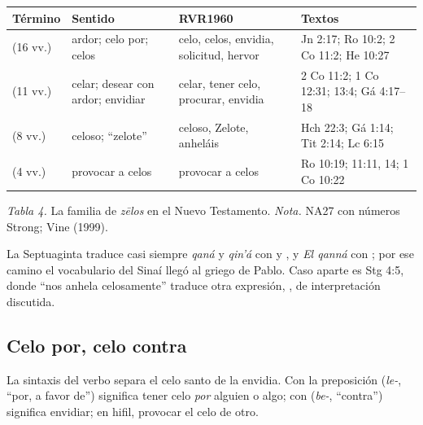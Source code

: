 \begin{center}\small\renewcommand{\arraystretch}{1.15}
\begin{tabular}{@{}L{2.8cm}L{3.6cm}L{3.6cm}L{3.8cm}@{}}
\toprule
\textbf{Término} & \textbf{Sentido} & \textbf{RVR1960} & \textbf{Textos} \\ \midrule
{} (16 vv.) & ardor; celo por; celos & celo, celos, envidia, solicitud, hervor & Jn 2:17; Ro 10:2; 2 Co 11:2; He 10:27 \\
 (11 vv.) & celar; desear con ardor; envidiar & celar, tener celo, procurar, envidia & 2 Co 11:2; 1 Co 12:31; 13:4; Gá 4:17--18 \\
 (8 vv.) & celoso; ``zelote'' & celoso, Zelote, anheláis & Hch 22:3; Gá 1:14; Tit 2:14; Lc 6:15 \\
 (4 vv.) & provocar a celos & provocar a celos & Ro 10:19; 11:11, 14; 1 Co 10:22 \\
\bottomrule
\end{tabular}\par
{\footnotesize\color{gris}\textit{Tabla 4.} La familia de \emph{zēlos} en el Nuevo Testamento. \textit{Nota.} NA27 con números Strong; Vine (1999).}
\end{center}

La Septuaginta traduce casi siempre \emph{qaná} y \emph{qin'á} con  y , y \emph{El qanná} con ; por ese camino el vocabulario del Sinaí llegó al griego de Pablo. Caso aparte es Stg 4:5, donde ``nos anhela celosamente'' traduce otra expresión, , de interpretación discutida.

\subsection{Celo por, celo contra}
La sintaxis del verbo separa el celo santo de la envidia. Con la preposición  (\emph{le-}, ``por, a favor de'') significa tener celo \emph{por} alguien o algo; con  (\emph{be-}, ``contra'') significa envidiar; en hifil, provocar el celo de otro.

